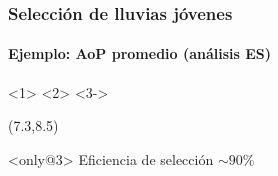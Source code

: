 \begin{frame}
 \frametitle{Selecci\'on de lluvias j\'ovenes}
 \framesubtitle{Ejemplo: AoP promedio (an\'alisis ES)}
	\begin{center}
	<3->
	\end{center}
	
	\begin{textblock}{4.3}(7.3,8.5)
		\begin{alertblock}{}<only@3>
		\centering
	         Eficiencia de selecci\'on $\sim 90\%$	
		\end{alertblock}
	\end{textblock}
	
\end{frame}

